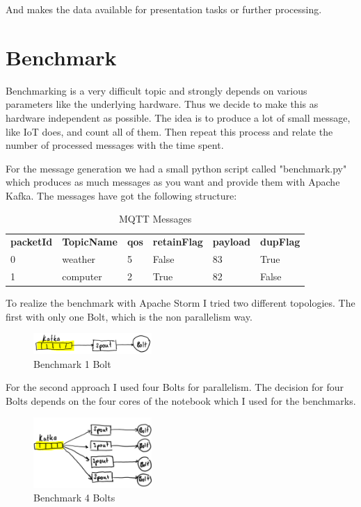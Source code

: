And makes the data available for presentation tasks or further processing.

\newpage
\section{Benchmark}

Benchmarking is a very difficult topic and strongly depends on various parameters like the underlying hardware.
Thus we decide to make this as hardware independent as possible.
The idea is to produce a lot of small message, like IoT does,
and count all of them. Then repeat this process and relate the number of processed messages with the time spent.

For the message generation we had a small python script called "benchmark.py" which produces as much messages as you want
and provide them with Apache Kafka.
The messages have got the following structure:

\begin{table}[h!]
 \centering
 \begin{tabular}{llllll}
   \textbf{packetId}  & \textbf{TopicName} & \textbf{qos} & \textbf{retainFlag} & \textbf{payload} & \textbf{dupFlag} \\
   0 & weather & 5 & False & 83 & True \\
   1 & computer & 2 & True & 82 & False \\
 \end{tabular}
 \caption{MQTT Messages}
 \label{tab:messages}
\end{table}

To realize the benchmark with Apache Storm I tried two different topologies.
The first with only one Bolt, which is the non parallelism way.
\begin{figure}[H]
\centering
\captionsetup{justification=centering}
\includegraphics[width=0.4\textwidth]{images/benchmark_topic1.png}
\caption[Benchmark 1 Bolt]{Benchmark 1 Bolt}
\end{figure}

For the second approach I used four Bolts for parallelism.
The decision for four Bolts depends on the four cores of the notebook which I used for the benchmarks.


\begin{figure}[H]
\centering
\captionsetup{justification=centering}
\includegraphics[width=0.4\textwidth]{images/benchmark_topic2.png}
\caption[Benchmark 4 Bolts]{Benchmark 4 Bolts}
\end{figure}

